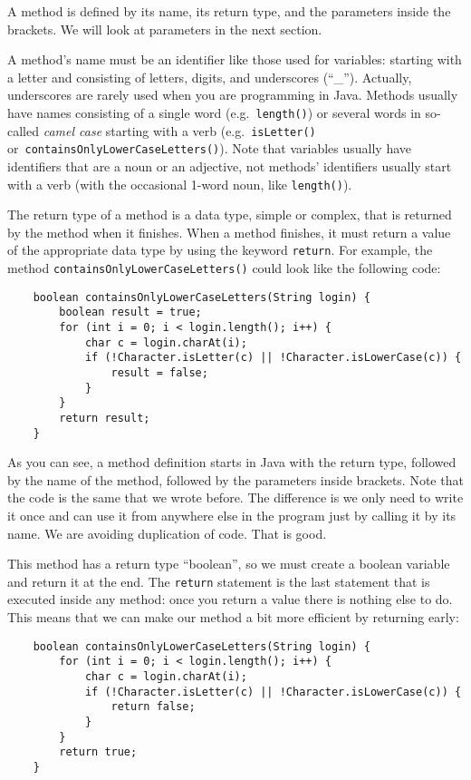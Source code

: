 A method is defined by its name, its return type, and the parameters
inside the brackets. We will look at parameters in the next section.

A method's name must be an identifier
like those used for variables: starting with a letter and consisting
of letters, digits, and underscores (``\_''). Actually, underscores
are rarely used when you are programming in Java. Methods
usually have names consisting of a single word
(e.g.~\verb+length()+) or several words in so-called \emph{camel case}
starting with a verb (e.g.~\verb+isLetter()+
or~\verb+containsOnlyLowerCaseLetters()+). Note that variables usually
have identifiers that are a noun or an adjective, not methods'
identifiers usually start with a verb (with the occasional 1-word
noun, like \verb+length()+).

The return type of a method is a data type, simple or complex, that is
returned by the method when it finishes. When a method finishes, it
must return a value of the appropriate data type by using the keyword
\verb+return+. For example, the method
\verb+containsOnlyLowerCaseLetters()+ could look 
like the following code:

\begin{verbatim}
    boolean containsOnlyLowerCaseLetters(String login) {
        boolean result = true;
        for (int i = 0; i < login.length(); i++) {
            char c = login.charAt(i);
            if (!Character.isLetter(c) || !Character.isLowerCase(c)) {
                result = false;
            }
        }
        return result;
    }
\end{verbatim}

As you can see, a method definition starts in Java with the return
type, followed by the name of the method, followed by the parameters
inside brackets. 
Note that the code is the same that we wrote before. The difference is
we only need to write it once and can use it from anywhere else in the
program just by calling it by its name. 
We are avoiding duplication of code. That is good. 

This method has a return type ``boolean'', so we
must create a boolean variable and return it at the end. The \verb+return+
statement is the last statement that is executed inside any method:
once you return a value there is nothing else to do. This means
that we can make our method a bit more efficient by returning early: 

\begin{verbatim}
    boolean containsOnlyLowerCaseLetters(String login) {
        for (int i = 0; i < login.length(); i++) {
            char c = login.charAt(i);
            if (!Character.isLetter(c) || !Character.isLowerCase(c)) {
                return false;
            }
        }
        return true;
    }
\end{verbatim}

